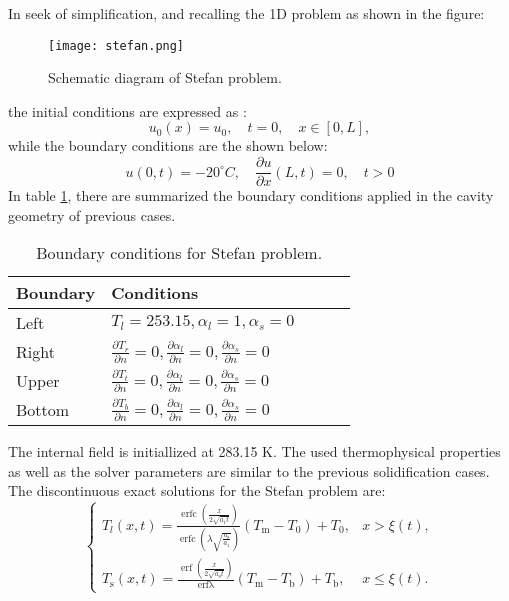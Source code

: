 \setlength{\parindent}{0.5cm} In seek of simplification, and recalling the 1D problem as shown in the figure:
\begin{figure}[h!]
	\centering
	\texttt{[image: stefan.png]}	
	\label{Stefanfig}
	\caption{Schematic diagram of Stefan problem.}
\end{figure} 
\newline
the initial conditions are expressed as \cite{zhao_zhao_xu_2018}:
\begin{equation}
	u_{0}(x)=u_{0}, \quad t=0, \quad x \in[0, L],
	\label{3.45}
\end{equation}
while the boundary conditions are the shown below:
\begin{equation}
	u(0, t)=-20^{\circ}C, \quad \frac{\partial u}{\partial x}(L, t)=0, \quad t>0
	\label{3.46}
\end{equation}
\clearpage
\noindent In table \ref{3.19tab}, there are summarized the boundary conditions applied in the cavity geometry of previous cases.
\begin{table}[h!]
	\begin{tabular}{@{}lllll@{}}
		\toprule[1pt]
		\textbf{Boundary} & \textbf{Conditions}  \\ \midrule[2pt]
		Left & $ T_{l} = 253.15, \alpha_{l} = 1, \alpha_{s} = 0    $  \\
		Right & $\frac{\partial T_{r}}{\partial n} = 0,  \frac{\partial \alpha_{l}}{\partial n} = 0, \frac{\partial \alpha_{s}}{\partial n} = 0  $ \\
		Upper & $\frac{\partial T_{t}}{\partial n} = 0, \frac{\partial \alpha_{l}}{\partial n} = 0, \frac{\partial \alpha_{s}}{\partial n} = 0$  \\
		Bottom & $\frac{\partial T_{b}}{\partial n} = 0, \frac{\partial \alpha_{l}}{\partial n} = 0, \frac{\partial \alpha_{s}}{\partial n} = 0 $  \\ \bottomrule[1pt]		
	\end{tabular}
	\centering
	\caption{Boundary conditions for Stefan problem.}	
	\label{3.19tab}
\end{table}
\newline
\noindent The internal field is initiallized at 283.15 K. The used thermophysical properties as well as the solver parameters are similar to the previous solidification cases.
\newline
The discontinuous exact solutions for the Stefan problem are:
\begin{equation}
	\begin{cases}T_{l}(x, t)=\frac{\operatorname{erfc}\left(\frac{x}{2 \sqrt{a_{1} t}}\right)}{\operatorname{erfc}\left(\lambda \sqrt{\frac{a_{\mathrm{s}}}{a_{1}}}\right)}\left(T_{\mathrm{m}}-T_{0}\right)+T_{0}, & x>\xi(t), \\ 
	T_{\mathrm{s}}(x, t)=\frac{\operatorname{erf}\left(\frac{x}{2 \sqrt{a_{\mathrm{s}} t}}\right)}{\operatorname{erf \lambda }}\left(T_{\mathrm{m}}-T_{\mathrm{b}}\right)+T_{\mathrm{b}},& x \leq \xi(t)  .\end{cases}
	\label{3.47}
\end{equation}
